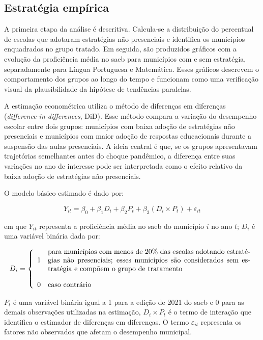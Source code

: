 \documentclass[
	12pt,				%
	openright,			%
	oneside,			%
	a4paper,			%
	brazil,				%
	]{article}
\begin{document}
\subsection{Estratégia empírica}

A primeira etapa da análise é descritiva. Calcula-se a distribuição do
percentual de escolas que adotaram estratégias não presenciais e identifica os
municípios enquadrados no grupo tratado. Em seguida, são produzidos gráficos com
a evolução da proficiência média no \acrshort{saeb} para municípios com e sem
estratégia, separadamente para Língua Portuguesa e Matemática. Esses gráficos
descrevem o comportamento dos grupos ao longo do tempo e funcionam como uma
verificação visual da plausibilidade da hipótese de tendências paralelas.

A estimação econométrica utiliza o método de diferenças em diferenças
(\textit{difference-in-differences}, DiD). Esse método compara a variação do
desempenho escolar entre dois grupos: municípios com baixa adoção de estratégias
não presenciais e municípios com maior adoção de respostas educacionais durante
a suspensão das aulas presenciais. A ideia central é que, se os grupos
apresentavam trajetórias semelhantes antes do choque pandêmico, a diferença
entre suas variações no ano de interesse pode ser interpretada como o efeito
relativo da baixa adoção de estratégias não presenciais.

O modelo básico estimado é dado por:

\begin{equation}
Y_{it} = \beta_0 + \beta_1 D_i + \beta_2 P_t +
\beta_3(D_i \times P_t) + \varepsilon_{it}
\end{equation}

em que $Y_{it}$ representa a proficiência média no \acrshort{saeb} do município
$i$ no ano $t$; $D_i$ é uma variável binária dada por:

\begin{equation}
 D_{i} = \left\{
 \begin{array}{rl}
  1 & \text{\parbox{10cm}{para municípios com menos de 20\% das escolas adotando estratégias não presenciais; esses municípios são considerados sem estratégia e compõem o grupo de tratamento}} \\
  \\
  0 & \text{caso contrário}
 \end{array}
 \right.
\end{equation}

$P_t$ é uma variável binária igual a 1 para a edição de 2021 do \acrshort{saeb}
e 0 para as demais observações utilizadas na estimação, $D_i \times P_t$ é o
termo de interação que identifica o estimador de diferenças em diferenças. O
termo $\varepsilon_{it}$ representa os fatores não observados que afetam o
desempenho municipal.
\end{document}
